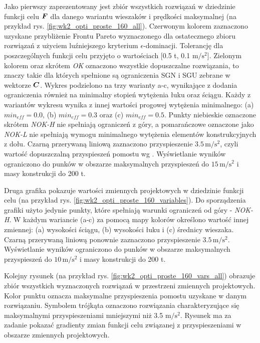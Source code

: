 Jako pierwszy zaprezentowany jest zbiór wszystkich rozwiązań w dziedzinie funkcji celu $\bm{F}$ dla danego wariantu wieszaków i prędkości maksymalnej (na przykład rys. \ref{fig:wk2_opti_proste_160_all}). Czerwonym kolorem zaznaczono uzyskane przybliżenie Frontu Pareto wyznaczonego dla ostatecznego zbioru rozwiązań z użyciem luźniejszego kryterium $\epsilon$-dominacji. Tolerancję dla poszczególnych funkcji celu przyjęto o wartościach [0.5 t, 0.1 $\mathrm{m/s^2}$]. Zielonym kolorem oraz skrótem \textit{OK} oznaczono wszystkie dopuszczalne rozwiązania, to znaczy takie dla których spełnione są ograniczenia SGN i SGU zebrane w wektorze $\bm{C}$.  Wykres podzielono na trzy warianty a-c, wynikające z dodania ograniczenia również na minimalny stopień wytężenia łuku oraz ściągu. Każdy z wariantów wykresu wynika z innej wartości progowej wytężenia minimalnego: (a) $min_{eff}=0.0$, (b) $min_{eff}=0.3$ oraz (c) $min_{eff}=0.5$. Punkty niebieskie oznaczone skrótem \textit{NOK-H} nie spełniają ograniczeń z góry, a pomarańczowe oznaczone jako \textit{NOK-L} nie spełniają wymogu minimalnego wytężenia elementów konstrukcyjnych z dołu. Czarną przerywaną liniową zaznaczono przyspieszenie $3.5\,\mathrm{m/s^2}$, czyli wartość dopuszczalną przyspieszeń pomostu wg \cite{PKNc}. Wyświetlanie wyników ograniczono do punków w obszarze maksymalnych przyspieszeń do  $15\,\mathrm{m/s^2}$ i masy konstrukcji do 200 t.

Druga grafika pokazuje wartości zmiennych projektowych w dziedzinie funkcji celu (na przykład rys. \ref{fig:wk2_opti_proste_160_variables}). Do sporządzenia grafiki użyto jedynie punkty, które spełniają warunki ograniczeń od góry - \textit{NOK-H}. W każdym wariancie (a-c) za pomocą mapy kolorów określono wartość innej zmiennej: (a) wysokości ściągu, (b) wysokości łuku i (c) średnicy wieszaka. Czarną przerywaną liniową ponownie zaznaczono przyspieszenie $3.5\,\mathrm{m/s^2}$. Wyświetlanie wyników ograniczono do punków w obszarze maksymalnych przyspieszeń do $10\,\mathrm{m/s^2}$ i masy konstrukcji do 200 t.

Kolejny rysunek (na przykład rys. \ref{fig:wk2_opti_proste_160_vars_all}) obrazuje zbiór wszystkich wyznaczonych rozwiązań w przestrzeni zmiennych projektowych. Kolor punktu oznacza maksymalne przyspieszenia pomostu uzyskane w danym rozwiązaniu. Symbolem trójkąta oznaczono rozwiązania charakteryzujące się maksymalnymi przyspieszeniami mniejszymi niż 3.5 $\mathrm{m/s^2}$. Rysunek ma za zadanie pokazać gradienty zmian funkcji celu związanej z przyspieszeniami w obszarze zmiennych projektowych.


